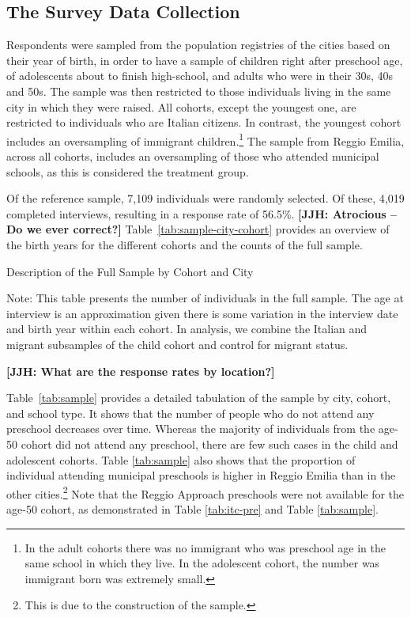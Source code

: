 \subsection{The Survey Data Collection}

Respondents were sampled from the population registries of the cities based on their year of birth, in order to have a sample of children right after preschool age, of adolescents about to finish high-school, and adults who were in their 30s, 40s and 50s. The sample was then restricted to those individuals living in the same city in which they were raised. All cohorts, except the youngest one, are restricted to individuals who are Italian citizens. In contrast, the youngest cohort includes an oversampling of immigrant children.\footnote{In the adult cohorts there was no immigrant who was preschool age in the same school in which they live. In the adolescent cohort, the number was immigrant born was extremely small.} The sample from Reggio Emilia, across all cohorts, includes an oversampling of those who attended municipal schools, as this is considered the treatment group.

Of the reference sample, 7,109 individuals were randomly selected. Of these, 4,019 completed interviews, resulting in a response rate of 56.5\%. \textbf{[JJH: Atrocious -- Do we ever correct?]} Table~\ref{tab:sample-city-cohort} provides an overview of the birth years for the different cohorts and the counts of the full sample.
\begin{table}[H]
\centering
\begin{threeparttable}
	\caption{Description of the Full Sample by Cohort and City}\label{tab:sample-city-cohort}
	
\begin{tablenotes}
\footnotesize
Note: This table presents the number of individuals in the full sample. The age at interview is an approximation given there is some variation in the interview date and birth year within each cohort. In analysis, we combine the Italian and migrant subsamples of the child cohort and control for migrant status.
\end{tablenotes}
\end{threeparttable}
\end{table}

\textbf{[JJH: What are the response rates by location?]}

Table~\ref{tab:sample} provides a detailed tabulation of the sample by city, cohort, and school type. It shows that the number of people who do not attend any preschool decreases over time. Whereas the majority of individuals from the age-50 cohort did not attend any preschool, there are few such cases in the child and adolescent cohorts. Table \ref{tab:sample} also shows that the proportion of individual attending municipal preschools is higher in Reggio Emilia than in the other cities.\footnote{This is due to the construction of the sample.} Note that the Reggio Approach preschools were not available for the age-50 cohort, as demonstrated in Table \ref{tab:itc-pre} and Table \ref{tab:sample}.

